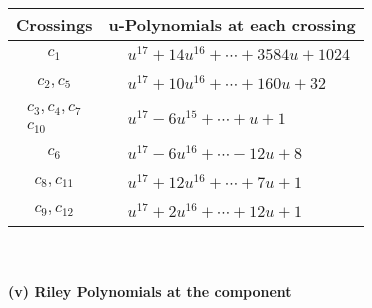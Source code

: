 \documentclass[1p]{elsarticle_modified}
\theoremstyle{definition}
\begin{document}
\begin{tabular}{m{50pt}|m{274pt}}
Crossings & \hspace{64pt}u-Polynomials at each crossing \\
\hline $$\begin{aligned}c_{1}\end{aligned}$$&$\begin{aligned}
&u^{17}+14 u^{16}+\cdots+3584 u+1024
\end{aligned}$\\
\hline $$\begin{aligned}c_{2},c_{5}\end{aligned}$$&$\begin{aligned}
&u^{17}+10 u^{16}+\cdots+160 u+32
\end{aligned}$\\
\hline $$\begin{aligned}c_{3},c_{4},c_{7}\\c_{10}\end{aligned}$$&$\begin{aligned}
&u^{17}-6 u^{15}+\cdots+u+1
\end{aligned}$\\
\hline $$\begin{aligned}c_{6}\end{aligned}$$&$\begin{aligned}
&u^{17}-6 u^{16}+\cdots-12 u+8
\end{aligned}$\\
\hline $$\begin{aligned}c_{8},c_{11}\end{aligned}$$&$\begin{aligned}
&u^{17}+12 u^{16}+\cdots+7 u+1
\end{aligned}$\\
\hline $$\begin{aligned}c_{9},c_{12}\end{aligned}$$&$\begin{aligned}
&u^{17}+2 u^{16}+\cdots+12 u+1
\end{aligned}$\\
\hline
\end{tabular}\\~\\
\newpage\renewcommand{\arraystretch}{1}
\flushleft \textbf{(v) Riley Polynomials at the component}\newline \\
\end{document}
